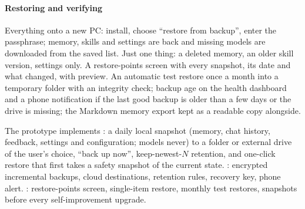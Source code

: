 \paragraph{Restoring and verifying} Everything onto a new PC: install, choose ``restore from backup'', enter the passphrase; memory, skills and settings are back and missing models are downloaded from the saved list. Just one thing: a deleted memory, an older skill version, settings only. A restore-points screen with every snapshot, its date and what changed, with preview. An automatic test restore once a month into a temporary folder with an integrity check; backup age on the health dashboard and a phone notification if the last good backup is older than a few days or the drive is missing; the Markdown memory export kept as a readable copy alongside.

The prototype implements : a daily local snapshot (memory, chat history, feedback, settings and configuration; models never) to a folder or external drive of the user's choice, ``back up now'', keep-newest-$N$ retention, and one-click restore that first takes a safety snapshot of the current state. : encrypted incremental backups, cloud destinations, retention rules, recovery key, phone alert. : restore-points screen, single-item restore, monthly test restores, snapshots before every self-improvement upgrade.
